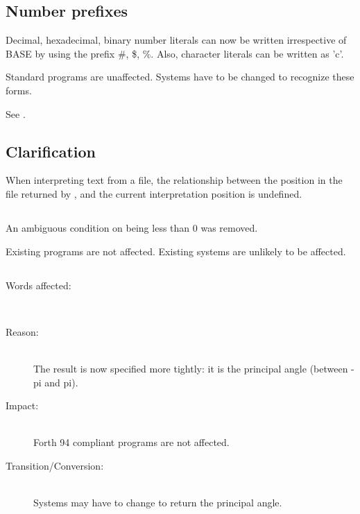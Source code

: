 \subsection{Number prefixes} %
 \label{diff:12:prefix}

Decimal, hexadecimal, binary number literals can now be written
irrespective of BASE by using the prefix \#, \$, \%.  Also, character
literals can be written as 'c'.
 
Standard programs are unaffected.  Systems have to be changed to
recognize these forms.

See .
 

\subsection[SOURCE-ID Clarification]{ Clarification} %
\label{diff:12:sourceid}

When interpreting text from a file, the relationship between the position in the
file returned by , and the current interpretation position is
undefined.


\subsection[FASINH]{} %
 \label{diff:12:fasinh}

An ambiguous condition on  being less than 0 was removed.

Existing programs are not affected.  Existing systems are
unlikely to be affected.


\subsection[FATAN2]{} %
\label{diff:12:fatan2}

\begin{description}
\item[Words affected:] ~\\

\item[Reason:] ~\\
	The result is now specified more tightly: it is the principal angle
	(between -pi and pi).

\item[Impact:] ~\\
	Forth 94 compliant programs are not affected.

\item[Transition/Conversion:] ~\\
	Systems may have to change  to return
	the principal angle.
\end{description}


